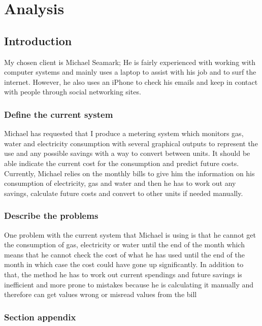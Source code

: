 \chapter{Analysis}

\section{Introduction}
My chosen client is Michael Seamark; He is fairly experienced with working with computer systems and mainly uses a laptop to assist with his job and to surf the internet. However, he also uses an iPhone to check his emails and keep in contact with people through social networking sites.

\subsection{Define the current system}
Michael has requested that I produce a metering system which monitors gas, water and electricity consumption with several graphical outputs to represent the use and any possible savings with a way to convert between units. It should be able indicate the current cost for the consumption and predict future costs. Currently, Michael relies on the monthly bills to give him the information on his consumption of electricity, gas and water and then he has to work out any savings, calculate future costs and convert to other units if needed manually.

\subsection{Describe the problems}
One problem with the current system that Michael is using is that he cannot get the consumption of gas, electricity or water until the end of the month which means that he cannot check the cost of what he has used until the end of the month in which case the cost could have gone up significantly. In addition to that, the method he has to work out current spendings and future savings is inefficient and more prone to mistakes because he is calculating it manually and therefore can get values wrong or misread values from the bill 

\subsection{Section appendix}
